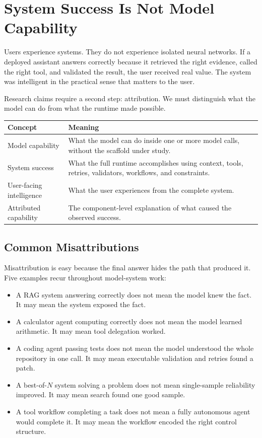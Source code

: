 \section{System Success Is Not Model Capability}
\label{sec:ch22-system-vs-model}

Users experience systems. They do not experience isolated neural networks. If a deployed assistant answers correctly because it retrieved the right evidence, called the right tool, and validated the result, the user received real value. The system was intelligent in the practical sense that matters to the user.

Research claims require a second step: attribution. We must distinguish what the model can do from what the runtime made possible.

\begin{center}
\begin{tabularx}{\textwidth}{@{}lX@{}}
\toprule
\textbf{Concept} & \textbf{Meaning} \\
\midrule
Model capability & What the model can do inside one or more model calls, without the scaffold under study. \\
System success & What the full runtime accomplishes using context, tools, retries, validators, workflows, and constraints. \\
User-facing intelligence & What the user experiences from the complete system. \\
Attributed capability & The component-level explanation of what caused the observed success. \\
\bottomrule
\end{tabularx}
\end{center}

\subsection{Common Misattributions}

Misattribution is easy because the final answer hides the path that produced it. Five examples recur throughout model-system work:

\begin{itemize}[leftmargin=1.5em]
  \item A RAG system answering correctly does not mean the model knew the fact. It may mean the system exposed the fact.
  \item A calculator agent computing correctly does not mean the model learned arithmetic. It may mean tool delegation worked.
  \item A coding agent passing tests does not mean the model understood the whole repository in one call. It may mean executable validation and retries found a patch.
  \item A best-of-$N$ system solving a problem does not mean single-sample reliability improved. It may mean search found one good sample.
  \item A tool workflow completing a task does not mean a fully autonomous agent would complete it. It may mean the workflow encoded the right control structure.
\end{itemize}

